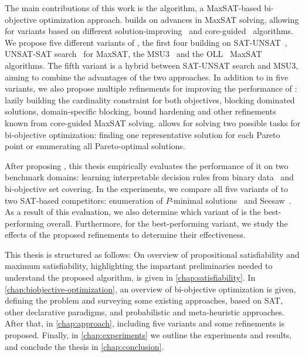The main contributions of this work is the \algname{} algorithm, a MaxSAT-based bi-objective optimization approach.
\algname{} builds on advances in MaxSAT solving, allowing for variants based on different solution-improving~\autocites{handbook2-maxsat,DBLP:journals/jsat/BerreP10,DBLP:journals/jsat/EenS06} and core-guided~\autocites{DBLP:journals/corr/abs-0712-1097,DBLP:conf/sat/AnsoteguiBL09,DBLP:conf/cp/MorgadoDM14,DBLP:journals/jsat/IgnatievMM19} algorithms.
We propose five different variants of \algname{}, the first four building on SAT-UNSAT~\autocite{DBLP:journals/jsat/BerreP10}, UNSAT-SAT search~\autocite{} for MaxSAT, the MSU3~\autocite{DBLP:journals/corr/abs-0712-1097} and the OLL~\autocite{DBLP:conf/cp/MorgadoDM14} MaxSAT algorithms.
The fifth variant is a hybrid between SAT-UNSAT search and MSU3, aiming to combine the advantages of the two approaches.
In addition to \algname{} in five variants, we also propose multiple refinements for improving the performance of \algname{}:
lazily building the cardinality constraint for both objectives, blocking dominated solutions, domain-specific blocking, bound hardening and other refinements known from core-guided MaxSAT solving.
\algname{} allows for solving two possible tasks for bi-objective optimization:
finding one representative solution for each Pareto point or enumerating all Pareto-optimal solutions.

After proposing \algname{}, this thesis empirically evaluates the performance of it on two benchmark domains:
learning interpretable decision rules from binary data~\autocite{DBLP:conf/cp/MaliotovM18} and bi-objective set covering.
In the experiments, we compare all five variants of \algname{} to two SAT-based competitors:
enumeration of $P$-minimal solutions~\autocite{DBLP:conf/cp/SohBTB17} and Seesaw~\autocite{DBLP:conf/cp/JanotaMSM21}.
As a result of this evaluation, we also determine which variant of \algname{} is the best-performing overall.
Furthermore, for the best-performing variant, we study the effects of the proposed refinements to determine their effectiveness.

This thesis is structured as follows:
On overview of propositional satisfiability and maximum satisfiability, highlighting the impartant preliminaries needed to understand the proposed algorithm, is given in \cref{chap:satisfiability}.
In \cref{chap:biobjective-optimization}, an overview of bi-objective optimization is given, defining the problem and surveying some existing approaches, based on SAT, other declarative paradigms, and probabilistic and meta-heuristic approaches.
After that, in \cref{chap:approach}, \algname{} including five variants and some refinements is proposed.
Finally, in \cref{chap:experiments} we outline the experiments and results, and conclude the thesis in \cref{chap:conclusion}.